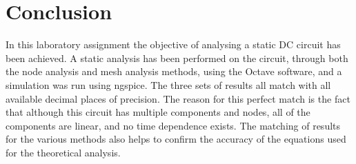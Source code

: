 \section{Conclusion}
\label{sec:conclusion}

In this laboratory assignment the objective of analysing a static DC circuit has been
achieved. A static analysis has been performed on the circuit, through both the
node analysis and mesh analysis methods, using the Octave software, and a simulation
was run using ngspice.
The three sets of results all match with all available decimal places of precision.
The reason for this perfect match is the fact that although this circuit has multiple
components and nodes, all of the components are linear, and no time dependence exists.
The matching of results for the various methods also helps to confirm the accuracy of the equations
used for the theoretical analysis.
